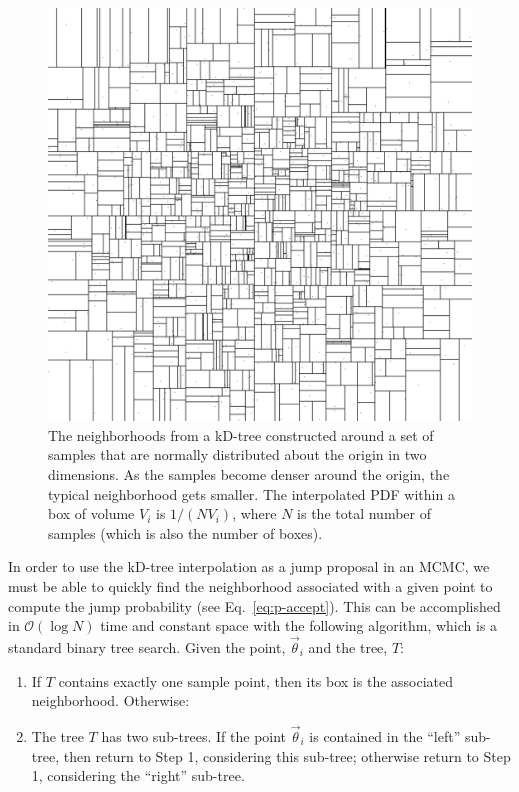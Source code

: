 \documentclass{rsos}
\newcommand{\vtheta}{\vec{\theta}}
\newcommand{\order}[1]{\mathcal{O}\left( #1 \right)}
\begin{document}
\begin{figure}
  \begin{center}
    \includegraphics[width=0.8\columnwidth]{Figure1_kdtree}
  \end{center}
  \caption{\label{fig:kD-tree} The neighborhoods from a kD-tree
    constructed around a set of samples that are normally distributed
    about the origin in two dimensions.  As the samples become denser
    around the origin, the typical neighborhood gets smaller.  The
    interpolated PDF within a box of volume $V_i$ is $1/(N V_i)$,
    where $N$ is the total number of samples (which is also the number
    of boxes).}
\end{figure}

In order to use the kD-tree interpolation as a jump proposal in an
MCMC, we must be able to quickly find the neighborhood associated with
a given point to compute the jump probability (see
Eq.~\ref{eq:p-accept}).  This can be accomplished in $\order{\log N}$
time and constant space with the following algorithm, which is a
standard binary tree search.  Given the point, $\vtheta_i$ and the
tree, $T$:
\begin{enumerate}
\item If $T$ contains exactly one sample point, then its box is the
  associated neighborhood.  Otherwise:
\item The tree $T$ has two sub-trees.  If the point $\vtheta_i$ is
  contained in the ``left'' sub-tree, then return to Step 1,
  considering this sub-tree; otherwise return to Step 1, considering
  the ``right'' sub-tree.
\end{enumerate}
\end{document}

